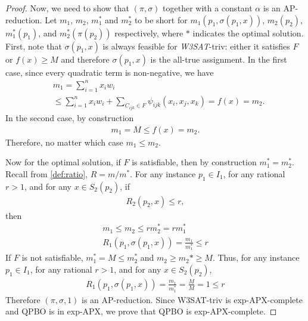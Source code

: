 \begin{proof}
Now, we need to show that $(\pi,\sigma)$ together with a constant $\alpha$ is an AP-reduction. 
Let $m_1$, $m_2$, $m_1^*$ and $m_2^*$ to be short for $m_1(p_1, \sigma(p_1, x))$, $m_2(p_2)$, $m_1^*(p_1)$, and $m_2^*(\pi(p_2))$ respectively, where $*$ indicates the optimal solution.  First, note that $\sigma(p_1, x)$ is always feasible for {\em W3SAT}-triv: either it satisfies $F$ or $f(x) \geq M$ and therefore $\sigma(p_1, x)$ is the all-true assignment. In the first case, since every quadratic term is non-negative, we have
\begin{align}
& m_1 = \sum_{i=1}^n x_i w_i \\
& \leq \sum_{i=1}^n x_i w_i + \sum_{C_{ijk} \in F} \psi_{ijk}(x_i,x_j,x_k) = f(x) = m_2.
\end{align}
In the second case, by construction
\begin{align}
m_1= M \leq f(x) = m_2.
\end{align}
Therefore, no matter which case $m_1 \leq m_2$.
\par
Now for the optimal solution, if $F$ is satisfiable, then by construction $m_1^* = m_2^*$. Recall from \cref{def:ratio}, $R = m/m^*$. 
For any instance $p_1 \in I_1$, for any rational $r > 1$, and for any $x \in S_2(p_2)$, if
\begin{align}
R_2(p_2, x) \leq r,
\end{align}
then
\begin{align}
m_1 \leq m_2 \leq rm_2^* = rm_1^* \\
R_1(p_1, \sigma(p_1, x)) = \frac{m_1}{m_1^*} \leq r
\end{align}
If $F$ is not satisfiable, $m_1^* = M \leq m_2^*$ and $m_2 \geq m_2* \geq M$. Thus, for any instance $p_1 \in I_1$, for any rational $r > 1$, and for any $x \in S_2(p_2)$,
\begin{align}
R_1(p_1, \sigma(p_1, x)) = \frac{m_1}{m_1^*} = \frac{M}{M} = 1 \leq r
\end{align}
Therefore $(\pi,\sigma, 1)$ is an AP-reduction. Since W3SAT-triv is exp-APX-complete and QPBO is in exp-APX, we prove that QPBO is exp-APX-complete.
\end{proof}


